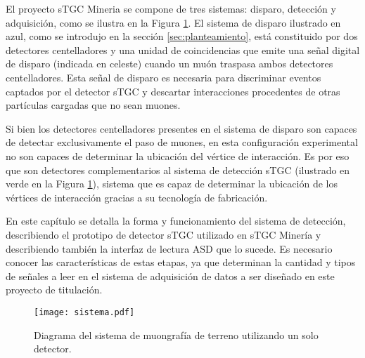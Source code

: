 	El proyecto sTGC Mineria se compone de tres sistemas: disparo, detección y adquisición, como se ilustra en la Figura \ref{fig:sistema-completo}. El sistema de disparo \cite{Oyanadel2020SISTEMASTGC} ilustrado en azul, como se introdujo en la sección \ref{sec:planteamiento}, está constituido por dos detectores centelladores y una unidad de coincidencias que emite una señal digital de disparo (indicada en celeste) cuando un muón traspasa ambos detectores centelladores. Esta señal de disparo es necesaria para discriminar eventos captados por el detector sTGC y descartar interacciones procedentes de otras partículas cargadas que no sean muones.
	
	Si bien los detectores centelladores presentes en el sistema de disparo son capaces de detectar exclusivamente el paso de muones, en esta configuración experimental no son capaces de determinar la ubicación del vértice de interacción. Es por eso que son detectores complementarios al sistema de detección sTGC (ilustrado en verde en la Figura \ref{fig:sistema-completo}), sistema que es capaz de determinar la ubicación de los vértices de interacción gracias a su tecnología de fabricación.
	
	En este capítulo se detalla la forma y funcionamiento del sistema de detección, describiendo el prototipo de detector sTGC utilizado en sTGC Minería y describiendo también la interfaz de lectura ASD que lo sucede. Es necesario conocer las características de estas etapas, ya que determinan la cantidad y tipos de señales a leer en el sistema de adquisición de datos a ser diseñado en este proyecto de titulación.
	
	\begin{figure}[h]
		\centering
		\texttt{[image: sistema.pdf]}
		\caption{Diagrama del sistema de muongrafía de terreno utilizando un solo detector.}
		\label{fig:sistema-completo}
	\end{figure}